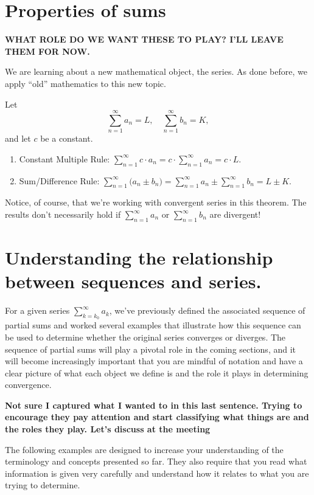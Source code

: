 \documentclass{ximera}
\begin{document}
\section{Properties of sums}
\textbf{WHAT ROLE DO WE WANT THESE TO PLAY? I'LL LEAVE THEM FOR NOW.}


We are learning about a new mathematical object, the series. As done
before, we apply ``old'' mathematics to this new topic.

\begin{theorem}
  Let
  \[
  \sum_{n=1}^\infty a_n = L,\quad \sum_{n=1}^\infty b_n =K, 
  \]
  and let $c$ be a constant.
\begin{enumerate}
\item Constant Multiple Rule: $\sum_{n=1}^\infty c\cdot a_n =
  c\cdot\sum_{n=1}^\infty a_n = c\cdot L.$
\item Sum/Difference Rule: $\sum_{n=1}^\infty \big(a_n\pm b_n\big) =
  \sum_{n=1}^\infty a_n \pm \sum_{n=1}^\infty b_n = L \pm K.$
\end{enumerate} 
\end{theorem}

Notice, of course, that we're working with convergent series in this 
theorem.  The results don't necessarily hold if $\sum_{n=1}^\infty a_n$ 
or $\sum_{n=1}^\infty b_n$ are divergent!

\section{Understanding the relationship between sequences and series.}

For a given series $\sum_{k=k_0}^{\infty} a_k$, we've previously defined the associated sequence of partial sums and worked several examples that illustrate how this sequence can be used to determine whether the original series converges or diverges.  The sequence of partial sums will play a pivotal role in the coming sections, and it will become increasingly important that you are mindful of notation and have a clear picture of what each object we define is and the role it plays in determining convergence.  

\textbf{Not sure I captured what I wanted to in this last sentence.  Trying to encourage they pay attention and start classifying what things are and the roles they play.  Let's discuss at the meeting}

The following examples are designed to increase your understanding of the terminology and concepts presented so far.  They also require that you read what information is given very carefully and understand how it relates to what you are trying to determine.
\end{document}
